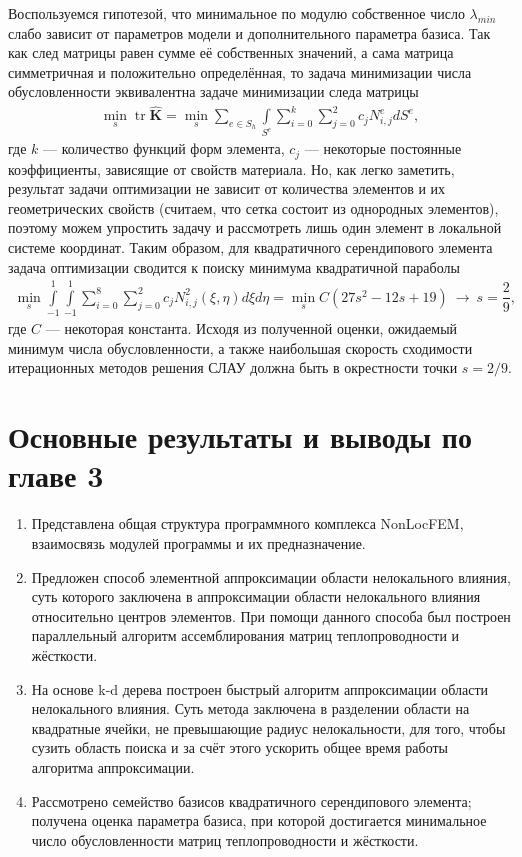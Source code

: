 Воспользуемся гипотезой, что минимальное по модулю собственное число $\lambda_{min}$ слабо зависит от параметров модели и дополнительного параметра базиса. Так как след матрицы равен сумме её собственных значений, а сама матрица симметричная и положительно определённая, то задача минимизации числа обусловленности эквивалентна задаче минимизации следа матрицы
\begin{gather*}
    \min\limits_s \operatorname{tr} \widehat{\mathbf{K}} =
    \min\limits_s \sum\limits_{e \in S_h} \int\limits_{S^e} \sum\limits_{i = 0}^k \sum\limits_{j = 0}^2 c_{j} N^e_{i,j} d S^e,
\end{gather*}
где $k$ --- количество функций форм элемента, $c_{j}$ --- некоторые постоянные коэффициенты, зависящие от свойств материала. Но, как легко заметить, результат задачи оптимизации не зависит от количества элементов и их геометрических свойств (считаем, что сетка состоит из однородных элементов), поэтому можем упростить задачу и рассмотреть лишь один элемент в локальной системе координат. Таким образом, для квадратичного серендипового элемента задача оптимизации сводится к поиску минимума квадратичной параболы
\begin{gather}
	\label{eq:ParamSOptimal}
	\min\limits_s \int\limits_{-1}^{1} \int\limits_{-1}^{1} \sum\limits_{i = 0}^8 \sum\limits_{j = 0}^2 c_{j} N_{i, j}^2(\xi, \eta) d\xi d\eta =
	\min\limits_s C (27 s^2 -12 s + 19) \
	\rightarrow \ s = \dfrac{2}{9},
\end{gather}
где $C$ --- некоторая константа. Исходя из полученной оценки, ожидаемый минимум числа обусловленности, а также наибольшая скорость сходимости итерационных методов решения СЛАУ должна быть в окрестности точки $s = 2/9$.

\section{Основные результаты и выводы по главе 3}\label{sec:ProgramComplex/Conclusion}

\begin{enumerate}
	\item Представлена общая структура программного комплекса NonLocFEM, взаимосвязь модулей программы и их предназначение.

	\item Предложен способ элементной аппроксимации области нелокального влияния, суть которого заключена в аппроксимации области нелокального влияния относительно центров элементов. При помощи данного способа был построен параллельный алгоритм ассемблирования матриц теплопроводности и жёсткости.
	
	\item На основе k-d дерева построен быстрый алгоритм аппроксимации области нелокального влияния. Суть метода заключена в разделении области на квадратные ячейки, не превышающие радиус нелокальности, для того, чтобы сузить область поиска и за счёт этого ускорить общее время работы алгоритма аппроксимации.
	
	\item Рассмотрено семейство базисов квадратичного серендипового элемента; получена оценка параметра базиса, при которой достигается минимальное число обусловленности матриц теплопроводности и жёсткости.
\end{enumerate}
